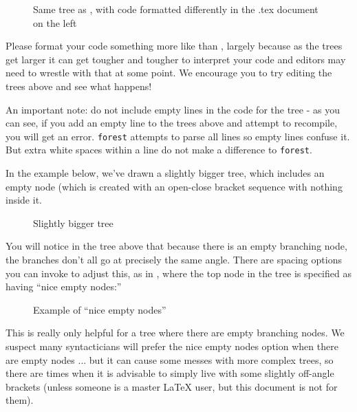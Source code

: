 \documentclass[output=paper,colorlinks,citecolor=brown,
]{langscibook}
\begin{document}
\begin{figure}
\caption{Same tree as , with code formatted differently in the .tex document on the left}
  \label{fig:diercks:FirstTreeExpanded}
\Forest{
[VP 
    [V\xhead] 
    [NP] 
] 
}
\end{figure}

\noindent Please format your code something more like   than , largely because as the trees get larger it can get tougher and tougher to interpret your code and editors may need to wrestle with that at some point. We encourage you to try editing the trees above and see what happens! 

An important note: do not include empty lines in the code for the tree - as you can see, if you add an empty line to the trees above and attempt to recompile, you will get an error. \texttt{forest} attempts to parse all lines so empty lines confuse it. But extra white spaces within a line do not make a difference to \texttt{forest}.

In the example below, we've drawn a slightly bigger tree, which includes an empty node (which is created with an open-close bracket sequence with nothing inside it. 

\begin{figure}
\caption{Slightly bigger tree}
  \label{fig:diercks:SlightlyBiggerTree}


\end{figure}


You will notice in the tree above that because there is an empty branching node, the branches don't all go at precisely the same angle. There are spacing options you can invoke to adjust this, as in , where the top node in the tree is specified as having ``nice empty nodes:'' 

\begin{figure}
\caption{Example of ``nice empty nodes''}
  \label{fig:diercks:ForestNiceEmptyNodes}


\end{figure}

\noindent This is really only helpful for a tree where there are empty branching nodes. We suspect many syntacticians will prefer the nice empty nodes option when there are empty nodes ... but it can cause some messes with more complex trees, so there are times when it is advisable to simply live with some slightly off-angle brackets (unless someone is a master \LaTeX{} user, but this document is not for them). 
\end{document}
